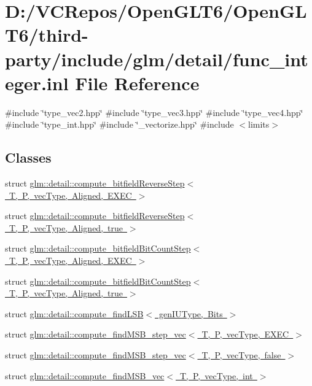 \hypertarget{func__integer_8inl}{}\section{D\+:/\+V\+C\+Repos/\+Open\+G\+L\+T6/\+Open\+G\+L\+T6/third-\/party/include/glm/detail/func\+\_\+integer.inl File Reference}
\label{func__integer_8inl}
{\ttfamily \#include \char`\"{}type\+\_\+vec2.\+hpp\char`\"{}}\newline
{\ttfamily \#include \char`\"{}type\+\_\+vec3.\+hpp\char`\"{}}\newline
{\ttfamily \#include \char`\"{}type\+\_\+vec4.\+hpp\char`\"{}}\newline
{\ttfamily \#include \char`\"{}type\+\_\+int.\+hpp\char`\"{}}\newline
{\ttfamily \#include \char`\"{}\+\_\+vectorize.\+hpp\char`\"{}}\newline
{\ttfamily \#include $<$limits$>$}\newline
\subsection*{Classes}
\begin{DoxyCompactItemize}
\item 
struct \mbox{\hyperlink{structglm_1_1detail_1_1compute__bitfield_reverse_step}{glm\+::detail\+::compute\+\_\+bitfield\+Reverse\+Step$<$ T, P, vec\+Type, Aligned, E\+X\+E\+C $>$}}
\item 
struct \mbox{\hyperlink{structglm_1_1detail_1_1compute__bitfield_reverse_step_3_01_t_00_01_p_00_01vec_type_00_01_aligned_00_01true_01_4}{glm\+::detail\+::compute\+\_\+bitfield\+Reverse\+Step$<$ T, P, vec\+Type, Aligned, true $>$}}
\item 
struct \mbox{\hyperlink{structglm_1_1detail_1_1compute__bitfield_bit_count_step}{glm\+::detail\+::compute\+\_\+bitfield\+Bit\+Count\+Step$<$ T, P, vec\+Type, Aligned, E\+X\+E\+C $>$}}
\item 
struct \mbox{\hyperlink{structglm_1_1detail_1_1compute__bitfield_bit_count_step_3_01_t_00_01_p_00_01vec_type_00_01_aligned_00_01true_01_4}{glm\+::detail\+::compute\+\_\+bitfield\+Bit\+Count\+Step$<$ T, P, vec\+Type, Aligned, true $>$}}
\item 
struct \mbox{\hyperlink{structglm_1_1detail_1_1compute__find_l_s_b}{glm\+::detail\+::compute\+\_\+find\+L\+S\+B$<$ gen\+I\+U\+Type, Bits $>$}}
\item 
struct \mbox{\hyperlink{structglm_1_1detail_1_1compute__find_m_s_b__step__vec}{glm\+::detail\+::compute\+\_\+find\+M\+S\+B\+\_\+step\+\_\+vec$<$ T, P, vec\+Type, E\+X\+E\+C $>$}}
\item 
struct \mbox{\hyperlink{structglm_1_1detail_1_1compute__find_m_s_b__step__vec_3_01_t_00_01_p_00_01vec_type_00_01false_01_4}{glm\+::detail\+::compute\+\_\+find\+M\+S\+B\+\_\+step\+\_\+vec$<$ T, P, vec\+Type, false $>$}}
\item 
struct \mbox{\hyperlink{structglm_1_1detail_1_1compute__find_m_s_b__vec}{glm\+::detail\+::compute\+\_\+find\+M\+S\+B\+\_\+vec$<$ T, P, vec\+Type, int $>$}}
\end{DoxyCompactItemize}
